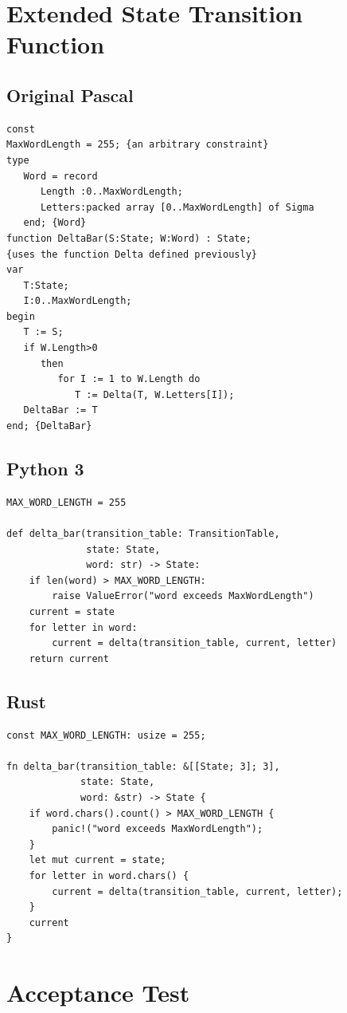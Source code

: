 \section{Extended State Transition Function}

\subsection*{Original Pascal}
\begin{verbatim}
const
MaxWordLength = 255; {an arbitrary constraint}
type
   Word = record
      Length :0..MaxWordLength;
      Letters:packed array [0..MaxWordLength] of Sigma
   end; {Word}
function DeltaBar(S:State; W:Word) : State;
{uses the function Delta defined previously}
var
   T:State;
   I:0..MaxWordLength;
begin
   T := S;
   if W.Length>0
      then
         for I := 1 to W.Length do
            T := Delta(T, W.Letters[I]);
   DeltaBar := T
end; {DeltaBar}
\end{verbatim}

\subsection*{Python 3}
\begin{verbatim}
MAX_WORD_LENGTH = 255

def delta_bar(transition_table: TransitionTable,
              state: State,
              word: str) -> State:
    if len(word) > MAX_WORD_LENGTH:
        raise ValueError("word exceeds MaxWordLength")
    current = state
    for letter in word:
        current = delta(transition_table, current, letter)
    return current
\end{verbatim}

\subsection*{Rust}
\begin{verbatim}
const MAX_WORD_LENGTH: usize = 255;

fn delta_bar(transition_table: &[[State; 3]; 3],
             state: State,
             word: &str) -> State {
    if word.chars().count() > MAX_WORD_LENGTH {
        panic!("word exceeds MaxWordLength");
    }
    let mut current = state;
    for letter in word.chars() {
        current = delta(transition_table, current, letter);
    }
    current
}
\end{verbatim}

\section{Acceptance Test}

